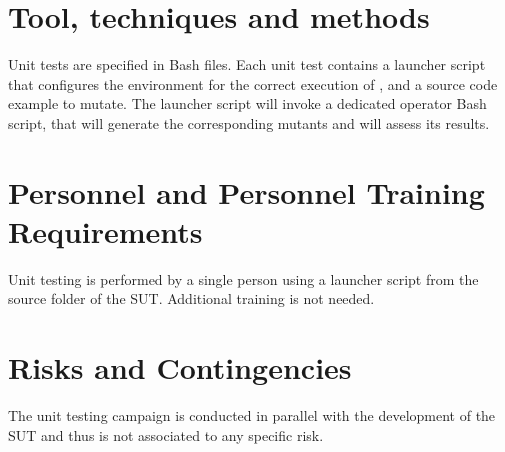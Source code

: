 \section{Tool, techniques and methods}

Unit tests are specified in Bash files. Each unit test contains a launcher script that configures the environment for the correct execution of \FAQAS, and a source code example to mutate. The launcher script will invoke a dedicated operator Bash script, that will generate the corresponding mutants and will assess its results.


\section{Personnel and Personnel Training Requirements}

Unit testing is performed by a single person using a launcher script from the source folder of the SUT. Additional training is not needed.

\section{Risks and Contingencies}

The unit testing campaign is conducted in parallel with the development of the SUT and thus is not associated to any specific risk.
